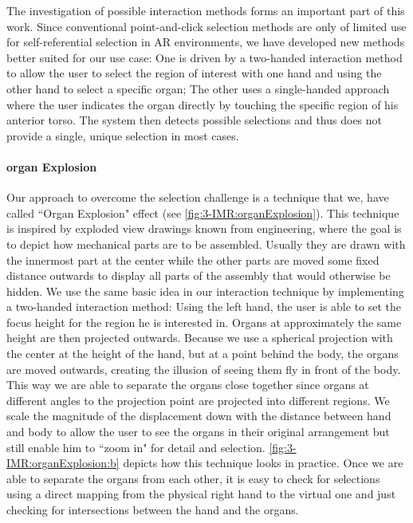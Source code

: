 The investigation of possible interaction methods forms an important part of this work. Since conventional point-and-click selection methods are only of limited use for self-referential selection in AR environments, we have developed new methods better suited for our use case: One is driven by a two-handed interaction method to allow the user to select the region of interest with one hand and using the other hand to select a specific organ; The other uses a single-handed approach where the user indicates the organ directly by touching the specific region of his anterior torso. The system then detects possible selections and thus does not provide a single, unique selection in most cases.

\paragraph{organ Explosion}
Our approach to overcome the selection challenge is a technique that we, have called ``Organ Explosion" effect (see \figurename{\ref{fig:3-IMR:organExplosion}}). This technique is inspired by exploded view drawings known from engineering, where the goal is to depict how mechanical parts are to be assembled. Usually they are drawn with the innermost part at the center while the other parts are moved some fixed distance outwards to display all parts of the assembly that would otherwise be hidden.
We use the same basic idea in our interaction technique by implementing a two-handed interaction method: Using the left hand, the user is able to set the focus height for the region he is interested in. Organs at approximately the same height are then projected outwards. Because we use a spherical projection with the center at the height of the hand, but at a point behind the body, the organs are moved outwards, creating the illusion of seeing them fly in front of the body. This way we are able to separate the organs close together since organs at different angles to the projection point are projected into different regions. We scale the magnitude of the displacement down with the distance between hand and body to allow the user to see the organs in their original arrangement but still enable him to ``zoom in" for detail and selection. \figurename{\ref{fig:3-IMR:organExplosion:b}} depicts how this technique looks in practice.
Once we are able to separate the organs from each other, it is easy to check for selections using a direct mapping from the physical right hand to the virtual one and just checking for intersections between the hand and the organs.
